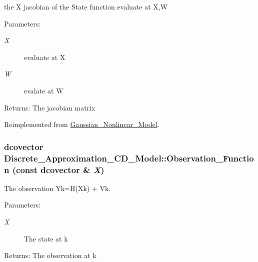 the X jacobian of the State function evaluate at X,W 

\begin{Desc}
\item[Parameters:]
\begin{description}
\item[{\em X}]evaluate at X \item[{\em W}]evalate at W\end{description}
\end{Desc}
\begin{Desc}
\item[Returns:]The jacobian matrix \end{Desc}


Reimplemented from \hyperlink{class_gaussian___nonlinear___model_ad4a587fcaab06d2d9e44d61cee814cf}{Gaussian\_\-Nonlinear\_\-Model}.\hypertarget{class_discrete___approximation___c_d___model_fe110c215bf843377888ad5ba823088e}{
\subsubsection[{Observation\_\-Function}]{\setlength{\rightskip}{0pt plus 5cm}dcovector Discrete\_\-Approximation\_\-CD\_\-Model::Observation\_\-Function (const dcovector \& {\em X})}}
\label{class_discrete___approximation___c_d___model_fe110c215bf843377888ad5ba823088e}


The observation Yk=H(Xk) + Vk. 

\begin{Desc}
\item[Parameters:]
\begin{description}
\item[{\em X}]The state at k\end{description}
\end{Desc}
\begin{Desc}
\item[Returns:]The observation at k \end{Desc}


